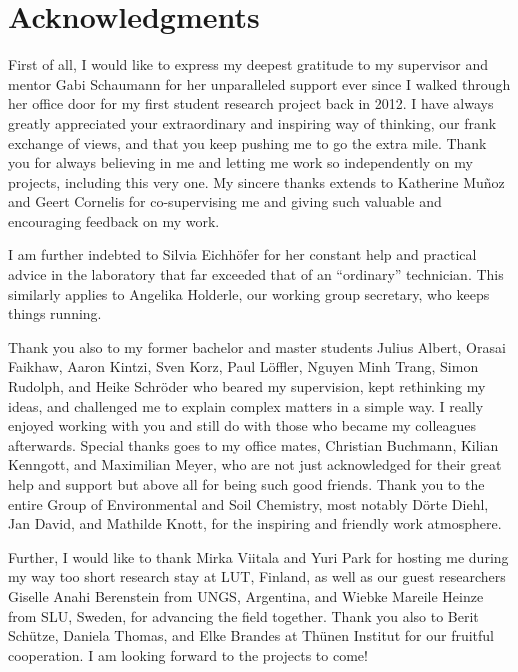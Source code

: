
\chapter{Acknowledgments}

First of all, I would like to express my deepest gratitude to my supervisor and mentor Gabi Schaumann for her unparalleled support ever since I walked through her office door for my first student research project back in 2012. I have always greatly appreciated your extraordinary and inspiring way of thinking, our frank exchange of views, and that you keep pushing me to go the extra mile. Thank you for always believing in me and letting me work so independently on my projects, including this very one.
My sincere thanks extends to Katherine Muñoz and Geert Cornelis for co-supervising me and giving such valuable and encouraging feedback on my work.

I am further indebted to Silvia Eichhöfer for her constant help and practical advice in the laboratory that far exceeded that of an ``ordinary'' technician. This similarly applies to Angelika Holderle, our working group secretary, who keeps things running.

Thank you also to my former bachelor and master students Julius Albert, Orasai Faikhaw, Aaron Kintzi, Sven Korz, Paul Löffler, Nguyen Minh Trang, Simon Rudolph, and Heike Schröder who beared my supervision, kept rethinking my ideas, and challenged me to explain complex matters in a simple way. I really enjoyed working with you and still do with those who became my colleagues afterwards.
Special thanks goes to my office mates, Christian Buchmann, Kilian Kenngott, and Maximilian Meyer, who are not just acknowledged for their great help and support but above all for being such good friends. Thank you to the entire Group of Environmental and Soil Chemistry, most notably Dörte Diehl, Jan David, and Mathilde Knott, for the inspiring and friendly work atmosphere.

Further, I would like to thank Mirka Viitala and Yuri Park for hosting me during my way too short research stay at LUT, Finland, as well as our guest researchers Giselle Anahi Berenstein from UNGS, Argentina, and Wiebke Mareile Heinze from SLU, Sweden, for advancing the field together. Thank you also to Berit Schütze, Daniela Thomas, and Elke Brandes at \foreignlanguage{ngerman}{Thünen Institut} for our fruitful cooperation. I am looking forward to the projects to come!

